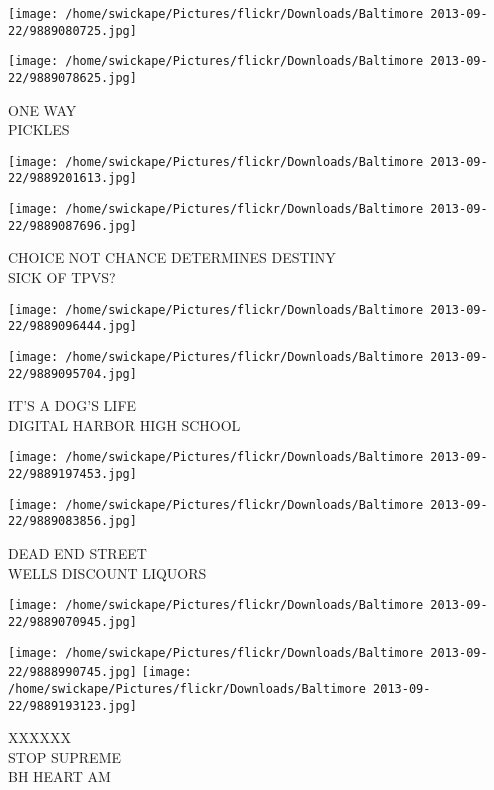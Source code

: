\documentclass[10pt,letterpaper]{article}
\begin{document}
\texttt{[image: /home/swickape/Pictures/flickr/Downloads/Baltimore 2013-09-22/9889080725.jpg]}

\vspace{0.25in}
\texttt{[image: /home/swickape/Pictures/flickr/Downloads/Baltimore 2013-09-22/9889078625.jpg]}

ONE WAY\\
PICKLES
\pagebreak

\texttt{[image: /home/swickape/Pictures/flickr/Downloads/Baltimore 2013-09-22/9889201613.jpg]}

\vspace{0.25in}
\texttt{[image: /home/swickape/Pictures/flickr/Downloads/Baltimore 2013-09-22/9889087696.jpg]}

CHOICE NOT CHANCE DETERMINES DESTINY\\
SICK OF TPVS?
\pagebreak

\texttt{[image: /home/swickape/Pictures/flickr/Downloads/Baltimore 2013-09-22/9889096444.jpg]}

\vspace{0.25in}
\texttt{[image: /home/swickape/Pictures/flickr/Downloads/Baltimore 2013-09-22/9889095704.jpg]}

IT'S A DOG'S LIFE\\
DIGITAL HARBOR HIGH SCHOOL
\pagebreak

\texttt{[image: /home/swickape/Pictures/flickr/Downloads/Baltimore 2013-09-22/9889197453.jpg]}

\vspace{0.25in}
\texttt{[image: /home/swickape/Pictures/flickr/Downloads/Baltimore 2013-09-22/9889083856.jpg]}

DEAD END STREET\\
WELLS DISCOUNT LIQUORS
\pagebreak

\texttt{[image: /home/swickape/Pictures/flickr/Downloads/Baltimore 2013-09-22/9889070945.jpg]}

\vspace{0.25in}
\texttt{[image: /home/swickape/Pictures/flickr/Downloads/Baltimore 2013-09-22/9888990745.jpg]}
\texttt{[image: /home/swickape/Pictures/flickr/Downloads/Baltimore 2013-09-22/9889193123.jpg]}

XXXXXX\\
STOP SUPREME\\
BH HEART AM
\pagebreak
\end{document}
